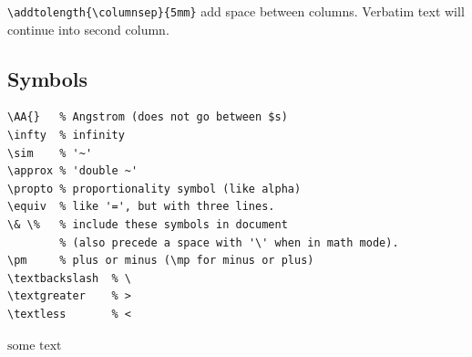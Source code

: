 \documentclass{article}
\begin{document}
\verb|\addtolength{\columnsep}{5mm}| add space between columns.
Verbatim text will continue into second column.

\begin{samepage}
\section{Symbols}
\begin{verbatim}
\AA{}   % Angstrom (does not go between $s)
\infty  % infinity
\sim    % '~'
\approx % 'double ~'
\propto % proportionality symbol (like alpha)
\equiv  % like '=', but with three lines.
\& \%   % include these symbols in document
        % (also precede a space with '\' when in math mode).
\pm     % plus or minus (\mp for minus or plus)
\textbackslash  % \
\textgreater    % >
\textless       % <
\end{verbatim}

$\textrm{some\ text}$    %
\end{samepage}
\end{document}
